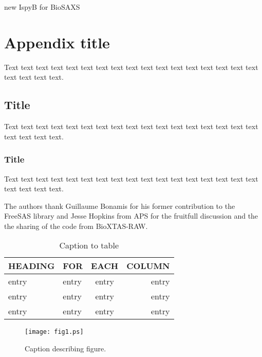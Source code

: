 \documentclass[preprint]{iucr}              %
\begin{document}
new IspyB for BioSAXS


\appendix
\section{Appendix title}

Text text text text text text text text text text text text text text
text text text text text text text.

\subsection{Title}

Text text text text text text text text text text text text text text
text text text text text text text.

\subsubsection{Title}

Text text text text text text text text text text text text text text
text text text text text text text.




The authors thank Guillaume Bonamis for his former contribution to the FreeSAS library and Jesse Hopkins from APS for the fruitfull 
discussion and the the sharing of the code from BioXTAS-RAW.




\begin{table}
\caption{Caption to table}
\begin{tabular}{llcr}      %
 HEADING    & FOR        & EACH       & COLUMN     \\
\hline
 entry      & entry      & entry      & entry      \\
 entry      & entry      & entry      & entry      \\
 entry      & entry      & entry      & entry      \\
\end{tabular}
\end{table}


\begin{figure}
\caption{Caption describing figure.}
\texttt{[image: fig1.ps]}
\end{figure}



\end{document}
